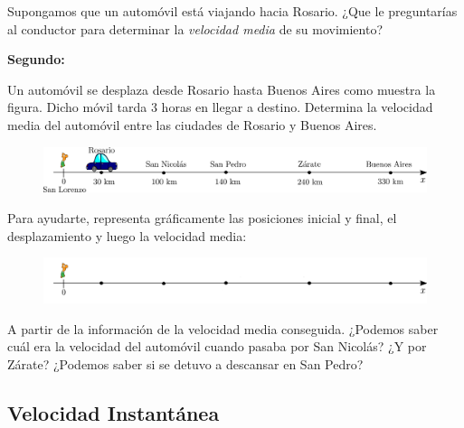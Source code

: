 \begin{comprension}


Supongamos que un automóvil está viajando hacia Rosario. ¿Que le preguntarías al conductor para determinar la \textit{velocidad media} de su movimiento?

\noindent
{\bf Segundo:}

Un automóvil se desplaza desde Rosario hasta Buenos Aires como muestra la figura. Dicho móvil tarda 3 horas en llegar a destino. Determina la velocidad media del automóvil entre las ciudades de Rosario y Buenos Aires.


\begin{figure}[H]
\centering
 \includegraphics[width=.9\textwidth]{img/viaje.png}
\end{figure}

Para ayudarte, representa gráficamente las posiciones inicial y final, el desplazamiento y luego la velocidad media:

\begin{figure}[H]
\centering
 \includegraphics[width=.9\textwidth]{img/viaje2.png}
\end{figure}



A partir de la información de la velocidad media conseguida. ¿Podemos saber cuál era la velocidad del automóvil cuando pasaba por San Nicolás? ¿Y por Zárate? ¿Podemos saber si se detuvo a descansar en San Pedro?
\end{comprension}

\subsection{Velocidad Instantánea}


